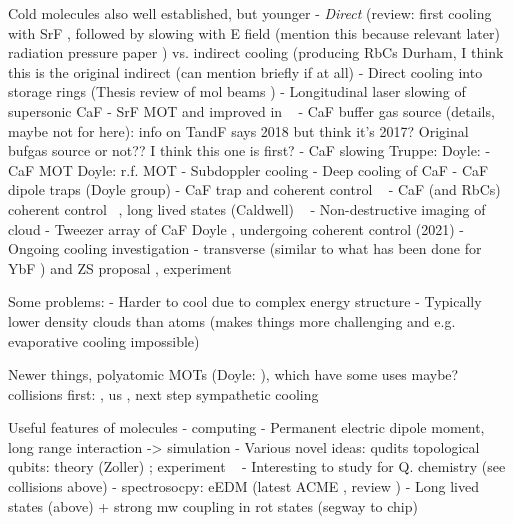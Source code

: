 Cold molecules also well established, but younger
- \emph{Direct} (review: \cite{Tarbutt2018} first cooling with SrF \cite{Shuman2009}, followed by
slowing with E field \cite{Bethlem1999} (mention this because relevant later)
radiation pressure paper \cite{PhysRevLett.108.103002}) vs. indirect cooling
(producing RbCs Durham\cite{PhysRevA.89.033604}, I think this is the original indirect \cite{Moses2017} (can mention briefly if at all)  
- Direct cooling into storage rings (Thesis \cite{Crompvoets2005} review of mol beams \cite{vandeMeerakker2012})
- Longitudinal laser slowing of supersonic CaF \cite{PhysRevA.89.053416}
- SrF MOT \cite{Barry2014} and improved in ~\cite{PhysRevLett.116.063004}
- CaF buffer gas source (details, maybe not for here): \cite{Truppe2018} %
info on TandF says 2018 but think it's 2017? Original bufgas source
\cite{Barry2011} or not?? I think this one is first? \cite{Maxwell2005}
- CaF slowing Truppe: \cite{Truppe2017a} Doyle: \cite{0953-4075-49-17-174001}
- CaF MOT Doyle: r.f. MOT \cite{PhysRevLett.119.103201}
- Subdoppler cooling \cite{Truppe2017}
- Deep cooling of CaF \cite{PhysRevLett.123.033202}
- CaF dipole traps (Doyle group)
- CaF trap and coherent control ~\cite{WilliamsMagnetic2018}
- CaF (and RbCs) coherent control ~\cite{Blackmore_2018}, long lived states
(Caldwell) ~\cite{PhysRevLett.124.063001}
- Non-destructive imaging of cloud \cite{PhysRevLett.121.083201}
- Tweezer array of CaF Doyle \cite{Anderegg2019}, undergoing coherent control
\cite{PhysRevLett.127.123202} (2021)
- Ongoing cooling investigation - transverse (similar to what has been done for
YbF \cite{Alauze2021}) and ZS proposal \cite{Fitch2016}, experiment \cite{PhysRevLett.127.263002}

Some problems:
- Harder to cool due to complex energy structure
- Typically lower density clouds than atoms (makes things more challenging and
e.g. evaporative cooling impossible)

Newer things, polyatomic MOTs (Doyle: \cite{Vilas2021}), which have some uses maybe? ~\cite{DoylePolyatomic2022}
collisions first: \cite{son2019collisional}, us \cite{Jurgilas2021, JurgilasPRL_2021}, next step sympathetic cooling

Useful features of molecules
- computing \cite{PhysRevLett.88.067901}
- Permanent electric dipole moment, long range interaction -> simulation
- Various novel ideas:
   qudits \cite{Sawant_2020}
   topological qubits: theory (Zoller) \cite{Micheli2006};  experiment ~\cite{Gross995}
- Interesting to study for Q. chemistry (see collisions above)
- spectrosocpy: eEDM
(latest ACME \cite{Andreev2018}, review \cite{ACMEreview})
- Long lived states (above) + strong mw coupling in rot states (segway to chip)


